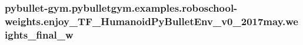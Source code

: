 \subsubsection[{\texorpdfstring{weights\+\_\+final\+\_\+w}{weights_final_w}}]{\setlength{\rightskip}{0pt plus 5cm}pybullet-\/gym.\+pybulletgym.\+examples.\+roboschool-\/weights.\+enjoy\+\_\+\+T\+F\+\_\+\+Humanoid\+Py\+Bullet\+Env\+\_\+v0\+\_\+2017may.\+weights\+\_\+final\+\_\+w}\hypertarget{namespacepybullet-gym_1_1pybulletgym_1_1examples_1_1roboschool-weights_1_1enjoy___t_f___humanoid_py_bullet_env__v0__2017may_ae2c09e3b55cb98155274e8d7a39d91a3}{}\label{namespacepybullet-gym_1_1pybulletgym_1_1examples_1_1roboschool-weights_1_1enjoy___t_f___humanoid_py_bullet_env__v0__2017may_ae2c09e3b55cb98155274e8d7a39d91a3}
